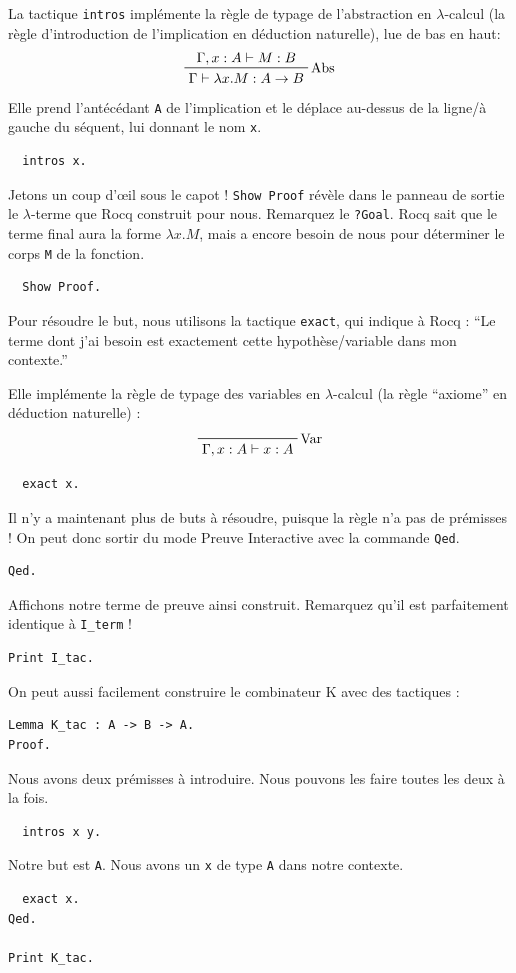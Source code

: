 \documentclass[11pt,a4paper]{article}
\begin{document}
La tactique \texttt{intros} implémente la règle de typage de l'abstraction en $\lambda$-calcul (la règle d'introduction de l'implication en déduction naturelle), lue de bas en haut:
$$\prftree[r]{Abs}{\Gamma, x : A \vdash M : B}{\Gamma \vdash \lambda x.M : A \to B}$$
Elle prend l'antécédant \texttt{A} de l'implication et le déplace au-dessus de la ligne/à gauche du séquent, lui donnant le nom \texttt{x}.

\begin{lstlisting}
  intros x.
\end{lstlisting}

Jetons un coup d'œil sous le capot ! \texttt{Show Proof} révèle dans le panneau de sortie le $\lambda$-terme que Rocq construit pour nous. Remarquez le \texttt{?Goal}. Rocq sait que le terme final aura la forme $\lambda x.M$, mais a encore besoin de nous pour déterminer le corps \texttt{M} de la fonction.

\begin{lstlisting}
  Show Proof.
\end{lstlisting}

Pour résoudre le but, nous utilisons la tactique \texttt{exact}, qui indique à Rocq : ``Le terme dont j'ai besoin est exactement cette hypothèse/variable dans mon contexte.''

Elle implémente la règle de typage des variables en $\lambda$-calcul (la règle ``axiome'' en déduction naturelle) :
$$\prftree[r]{Var}{\Gamma, x : A \vdash x : A}$$

\begin{lstlisting}
  exact x.
\end{lstlisting}

Il n'y a maintenant plus de buts à résoudre, puisque la règle n'a pas de prémisses ! On peut donc sortir du mode Preuve Interactive avec la commande \texttt{Qed}.

\begin{lstlisting}
Qed.
\end{lstlisting}

Affichons notre terme de preuve ainsi construit. Remarquez qu'il est parfaitement identique à \texttt{I\_term} !

\begin{lstlisting}
Print I_tac.
\end{lstlisting}

On peut aussi facilement construire le combinateur K avec des tactiques :

\begin{lstlisting}
Lemma K_tac : A -> B -> A.
Proof.
\end{lstlisting}
Nous avons deux prémisses à introduire. Nous pouvons les faire toutes les deux à la fois.
\begin{lstlisting}
  intros x y.
\end{lstlisting}
Notre but est \texttt{A}. Nous avons un \texttt{x} de type \texttt{A} dans notre contexte.
\begin{lstlisting}
  exact x.
Qed.

Print K_tac.
\end{lstlisting}
\end{document}
